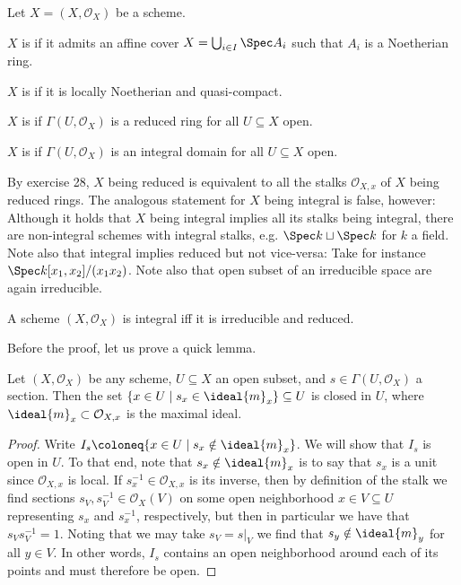 \documentclass[wip, algebra]{bsteffan-lecturenotes}
\newcommand{\cO}{\mathcal{O}}
\begin{document}
\begin{definition}
	Let $X = (X, \cO_X)$ be a scheme.
	\begin{alphanumerate}
		\item $X$ is  if it admits an affine cover $X = \bigcup_{i \in I} \Spec A_i$ such that $A_i$ is a Noetherian ring.
		\item $X$ is  if it is locally Noetherian and quasi-compact.
		\item $X$ is  if $\Gamma(U, \cO_X)$ is a reduced ring for all $U \subseteq X$ open.
		\item $X$ is  if $\Gamma(U, \cO_X)$ is an integral domain for all $U \subseteq X$ open.	
	\end{alphanumerate}
\end{definition}
By exercise 28, $X$ being reduced is equivalent to all the stalks $\cO_{X, x}$ of $X$ being reduced rings.
The analogous statement for $X$ being integral is false, however: 
Although it holds that $X$ being integral implies all its stalks being integral, there are non-integral schemes with integral stalks, e.g. $\Spec k \sqcup \Spec k$ for $k$ a field.
Note also that integral implies reduced but not vice-versa: 
Take for instance $\Spec k[x_1, x_2] / (x_1 x_2)$.
Note also that open subset of an irreducible space are again irreducible.
\begin{proposition}\label{prp:intiffirredred}
	A scheme $(X, \cO_X)$ is integral iff it is irreducible and reduced.
\end{proposition}
Before the proof, let us prove a quick lemma.
\begin{lemma}
	Let $(X, \cO_X)$ be any scheme, $U \subseteq X$ an open subset, and $s \in \Gamma(U, \cO_X)$ a section.
	Then the set $\{x \in U \mid s_x \in \ideal{m}_x\} \subseteq U$ is closed in $U$, where $\ideal{m}_x \subset \cO_{X, x}$ is the maximal ideal.
\end{lemma}
\begin{proof}
	Write $I_s \coloneq \{x \in U \mid s_x \notin \ideal{m}_x\}$.
	We will show that $I_s$ is open in $U$.
	To that end, note that $s_x \notin \ideal{m}_x$ is to say that $s_x$ is a unit since $\cO_{X, x}$ is local.
	If $s_x^{-1} \in \cO_{X, x}$ is its inverse, then by definition of the stalk we find sections $s_V, s_V^{-1} \in \cO_X(V)$ on some open neighborhood $x \in V \subseteq U$ representing $s_x$ and $s_x^{-1}$, respectively, but then in particular we have that $s_V s_V^{-1} = 1$.
	Noting that we may take $s_V = s|_V$ we find that $s_y \notin \ideal{m}_y$ for all $y \in V$.
	In other words, $I_s$ contains an open neighborhood around each of its points and must therefore be open.
\end{proof}
\end{document}
